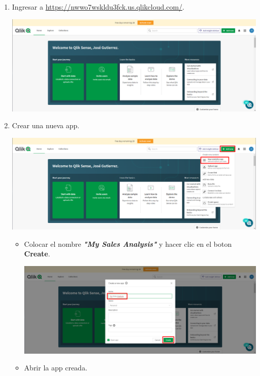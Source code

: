 \documentclass[12pt,letterpaper]{article}
\newcommand\tab[1][1cm]{\hspace*{#1}}
\begin{document}
    \begin{enumerate}[\tab 1.]
        \item Ingresar a \textcolor{azul}{\url{https://nwwo7wskldu3fck.us.qlikcloud.com/}}.
        \begin{center}
            \includegraphics[width=13cm]{./img/img1.png}
        \end{center}
        \item Crear una nueva app.
        \begin{center}
            \includegraphics[width=13cm]{./img/img2.png}
        \end{center}
        \begin{itemize}
            \item Colocar el nombre \textit{\textbf{"My Sales Analysis"}} y hacer clic en el boton \textbf{Create}.
            \begin{center}
                \includegraphics[width=13cm]{./img/img2.1.png}
            \end{center}
            \item Abrir la app creada.

\end{itemize}
\end{enumerate}
\end{document}
